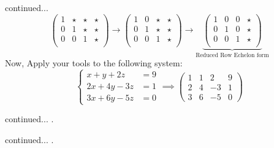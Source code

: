 \documentclass[11pt]{beamer}
\theoremstyle{plain}
\begin{document}
\begin{frame}{continued...}
    $$
\left(\begin{array}{ccc|c}
    1 & \star & \star & \star\\
    0 & 1 & \star & \star\\
    0 & 0 & 1 & \star\\
\end{array}\right) \rightarrow \left(\begin{array}{ccc|c}
    1 & 0 & \star & \star\\
    0 & 1 & \star & \star\\
    0 & 0 & 1 & \star\\
\end{array}\right) \rightarrow \underbrace{\left(\begin{array}{ccc|c}
    1 & 0 & 0 & \star\\
    0 & 1 & 0 & \star\\
    0 & 0 & 1 & \star\\
\end{array}\right)}_{\text{Reduced Row Echelon form}}
    $$
Now, Apply your tools to the following system:
$$
\begin{cases}
    x+y+2z&=9\\
    2x+4y-3z&=1\\
    3x+6y-5z&=0 
\end{cases} \implies \left(\begin{array}{ccc|c}
     1&1&2&9\\
     2&4&-3&1\\
     3&6&-5&0
\end{array}\right)
$$
\end{frame}
\begin{frame}{continued...}
    .
\end{frame}
\begin{frame}{continued...}
    .
\end{frame}
\end{document}
